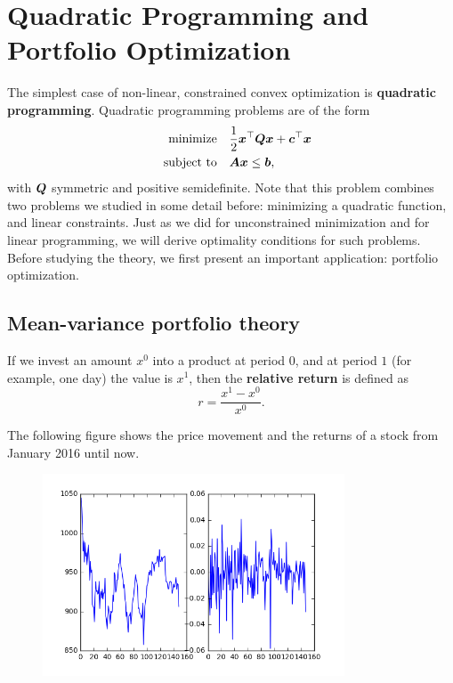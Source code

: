 \section{Quadratic Programming and Portfolio Optimization}
The simplest case of non-linear, constrained convex optimization is \textbf{quadratic programming}. Quadratic programming problems are of the form
\begin{align*}
  \text{minimize}\quad & \frac{1}{2}\bm{x}^{\top}\bm{Q}\bm{x}+\bm{c}^{\top}\bm{x}\\
  \quad\text{subject to}\quad & \bm{A}\bm{x}\leq \bm{b},
\end{align*}
with $\bm{Q}$ symmetric and positive semidefinite.
Note that this problem combines two problems we studied in some detail before: minimizing a quadratic function, and linear constraints. Just as we did for unconstrained minimization and for linear programming, we will derive optimality conditions for such problems. Before studying the theory, we first present an important application: portfolio optimization.

\subsection{Mean-variance portfolio theory}
If we invest an amount $x^0$ into a product at period $0$, and at period $1$ (for example, one day) the value is $x^1$, then the \textbf{relative return} is defined as
\begin{equation*}
  r = \frac{x^{1}-x^{0}}{x^{0}}.
\end{equation*}

The following figure shows the price movement and the returns of a stock from January 2016 until now.

\begin{figure}
\centering
\includegraphics[width=0.8\textwidth]{images/stock.png}
\end{figure}

